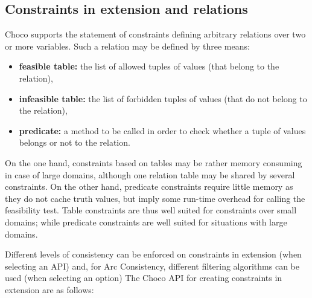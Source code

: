 
\subsection{Constraints in extension and relations}\label{model:arbitraryconstraintsinextension}\hypertarget{model:arbitraryconstraintsinextension}{}
Choco supports the statement of constraints defining arbitrary relations over two or more variables.
Such a relation may be defined by three means:
\begin{itemize}
	\item \textbf{feasible table:} the list of allowed tuples of values (that belong to the relation),
	\item \textbf{infeasible table:} the list of forbidden tuples of values (that do not belong to the relation),
	\item \textbf{predicate:} a method to be called in order to check whether a tuple of values belongs or not to the relation.
\end{itemize}
On the one hand, constraints based on tables may be rather memory consuming in case of large domains, although one relation table may be shared by several constraints. On the other hand, predicate constraints require little memory as they do not cache truth values, but imply some run-time overhead for calling the feasibility test. Table constraints are thus well suited for constraints over small domains; while predicate constraints are well suited for situations with large domains. 

Different levels of consistency can be enforced on constraints in extension (when selecting an API) and, for Arc Consistency, different filtering algorithms can be used (when selecting an option)
The Choco API for creating constraints in extension are as follows:

